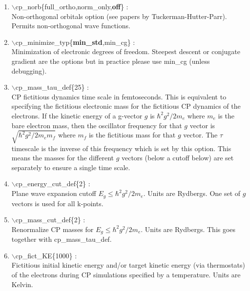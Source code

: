 \documentclass[12pt,titlepage]{article}
\begin{document}
\begin{enumerate}
 \vspace{0.15in} 
 \item  $\backslash$cp\_norb\{full\_ortho,norm\_only,{\bf off}\} : \\
     Non-orthogonal orbitals option (see papers by Tuckerman-Hutter-Parr).  Permits non-orthogonal wave functions.

 \vspace{0.15in} 
 \item  $\backslash$cp\_minimize\_typ\{{\bf min\_std},min\_cg\} : \\
      Minimization of electronic degrees of freedom.  Steepest descent or conjugate gradient are the options but in practice please use min\_cg (unless debugging).

 \vspace{0.15in} 
 \item  $\backslash$cp\_mass\_tau\_def\{25\} : \\
      CP fictitious dynamics time scale in femtoseconds.  This is equivalent to specifying the fictitious electronic mass for the fictitious CP dynamics of the electrons.  If the kinetic energy of a g-vector $g$ is $\hbar^2 g^2/2m_e$ where $m_e$ is the bare electron mass, then the oscillator frequency for that $g$ vector is $\sqrt{\hbar^2 g^2/2m_em_f}$ where $m_f$ is the fictitious mass for that $g$ vector.  The $\tau$ timescale is the inverse of this frequency which is set by this option.  This means the masses for the different $g$ vectors (below a cutoff below) are set separately to ensure a single time scale.

 \vspace{0.15in} 
 \item  $\backslash$cp\_energy\_cut\_def\{2\} : \\
      Plane wave expansion cutoff $E_g\le \hbar^2g^2/2m_e$.  Units are Rydbergs.  One set of $g$ vectors is used for all k-points.

 \vspace{0.15in} 
 \item  $\backslash$cp\_mass\_cut\_def\{2\} : \\
      Renormalize CP masses for $E_g\le\hbar^2g^2/2m_e$.  Units are Rydbergs.  This goes together with cp\_mass\_tau\_def.

 \vspace{0.15in} 
 \item  $\backslash$cp\_fict\_KE\{1000\} : \\
      Fictitious initial kinetic energy and/or target kinetic energy (via thermostats) of the electrons during CP simulations specified by a temperature.  Units are Kelvin.


\end{enumerate}
\end{document}
